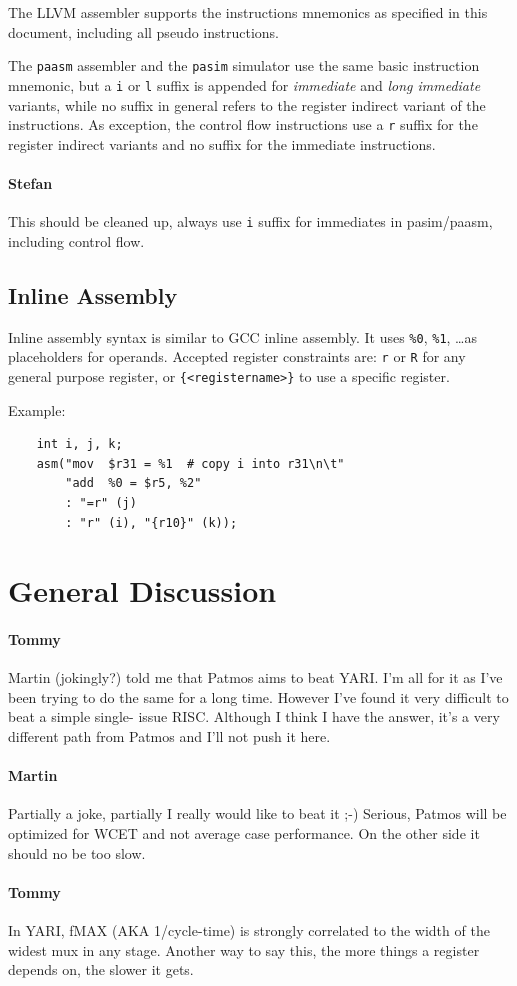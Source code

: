 \documentclass{IEEEtran}
\newcommand{\comment}[3]{\paragraph*{\textbf{#1}}{\color{#3}#2}}
\newcommand{\tommy}[1]{\comment{Tommy}{#1}{Red}}
\newcommand{\martin}[1]{\comment{Martin}{#1}{Blue}}
\newcommand{\stefan}[1]{\comment{Stefan}{#1}{RoyalPurple}}
\begin{document}
The LLVM assembler supports the instructions mnemonics as specified in this document, including all pseudo instructions.

The \texttt{paasm} assembler and the \texttt{pasim} simulator use the same basic instruction mnemonic, but a \texttt{i} or 
\texttt{l} suffix is appended for \emph{immediate} and \emph{long immediate} variants, while no suffix in general refers to 
the register indirect variant of the instructions. As exception, the control flow instructions use a \texttt{r} suffix for the register
indirect variants and no suffix for the immediate instructions.
\stefan{This should be cleaned up, always use \texttt{i} suffix for immediates in pasim/paasm, including control flow.}

\subsection{Inline Assembly}

Inline assembly syntax is similar to GCC inline assembly. It uses \texttt{\%0}, \texttt{\%1}, \ldots as placeholders
for operands. Accepted register constraints are: \texttt{r} or \texttt{R} for any general purpose register, or 
\texttt{\{<registername>\}} to use a specific register.

Example:
\begin{verbatim}
    int i, j, k;
    asm("mov  $r31 = %1  # copy i into r31\n\t"
        "add  %0 = $r5, %2"
        : "=r" (j)
        : "r" (i), "{r10}" (k));
\end{verbatim}

\section{General Discussion}


\tommy{Martin (jokingly?) told me that Patmos aims to
beat YARI. I'm all for it as I've been trying to do the same for a long
time. However I've found it very difficult to beat a simple single-
issue RISC. Although I think I have the answer, it's a very
different path from Patmos and I'll not push it here.}

\martin{Partially a joke, partially I really would like to beat it ;-)
Serious, Patmos will be optimized for WCET and not average
case performance. On the other side it should no be too slow.}

\tommy{In YARI, fMAX (AKA 1/cycle-time) is strongly correlated to the
 width of the widest mux in any stage. Another way to say this,
 the more things a register depends on, the slower it gets.}
\end{document}
